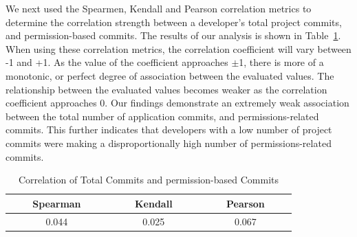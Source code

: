 \documentclass{sig-alternate-05-2015}
\newcommand{\todo}[1]{\textcolor{cyan}{\textbf{[#1]}}}
\begin{document}


We next used the Spearmen, Kendall and Pearson correlation metrics to determine the correlation strength between a developer's total project commits, and permission-based commits. The results of our analysis is shown in Table~\ref{Table:commitownership}. When using these correlation metrics, the correlation coefficient will vary between -1 and +1. As the value of the coefficient approaches $\pm$1, there is more of a monotonic, or perfect degree of association between the evaluated values. The relationship between the evaluated values becomes weaker as the correlation coefficient approaches 0. Our findings demonstrate an extremely weak association between the total number of application commits, and permissions-related commits. This further indicates that developers with a low number of project commits were making a disproportionally high number of permissions-related commits.

\begin{table}[h]
\begin{center}
\caption{Correlation of Total Commits and permission-based Commits}
\label{Table:commitownership}


    \begin{tabular}{ | c | c | c | } \hline

    \bfseries ~~~~Spearman~~~~ & \bfseries ~~~~Kendall~~~~ & \bfseries ~~~~Pearson~~~~  \\ \hline \hline
    0.044 & 0.025 & 0.067 \\ \hline
  \end{tabular}

  \end{center}
\end{table}





%	





\end{document}
